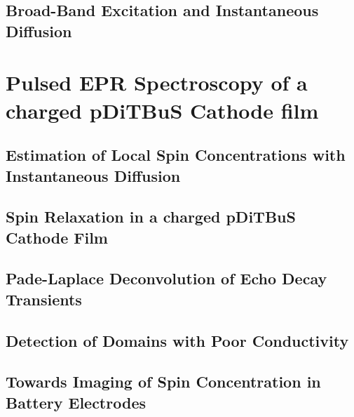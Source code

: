 \subsection{Broad-Band Excitation and Instantaneous Diffusion}
\section{Pulsed EPR Spectroscopy of a charged pDiTBuS Cathode film}
\subsection{Estimation of Local Spin Concentrations with Instantaneous Diffusion}
\subsection{Spin Relaxation in a charged pDiTBuS Cathode Film}
\subsection{Pade-Laplace Deconvolution of Echo Decay Transients}
\subsection{Detection of Domains with Poor Conductivity}
\subsection{Towards Imaging of Spin Concentration in Battery Electrodes}




